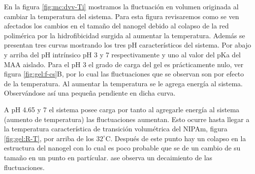 En la figura \ref{fig:mc:dvv-Ti} mostramos la fluctuaci\'on en volumen originada al cambiar la temperatura del sistema. Para esta figura revisaremos como se ven afectados los cambios en el tama\~no del nanogel debido al colapso de la red polim\'erica por la hidrofibicidad surgida al aumentar la temperatura. Adem\'as se presentan tres curvas mostrando los tres pH caracter\'isticos del sistema. Por abajo y arriba del pH intr\'insico pH 3 y 7 respectivamente y uno al valor del pKa del MAA aislado.
Para el pH 3 el grado de carga del gel es pr\'acticamente nulo, ver figura \ref{fig:gel:f-cs}B, por lo cual las fluctuaciones que se observan son por efecto de la temperatura. Al aumentar la temperatura se le agrega energ\'ia al sistema. Observ\'andose as\'i una peque\~na pendiente en dicha curva.

A pH 4.65 y 7 el sistema posee carga por tanto al agregarle energ\'ia al sistema (aumento de temperatura) las fluctuaciones aumentan. Esto ocurre hasta llegar a la temperatura caracter\'istica de transici\'on volum\'etrica del NIPAm, figura \ref{fig:gel:R-T}, por arriba de los $32 ^\circ$C. Despu\'es de este punto hay un colapso en la estructura del nanogel con lo cual es poco probable que se de un cambio de su tama\~no en un punto en part\'icular. ase observa un decaimiento de las fluctuaciones. 






